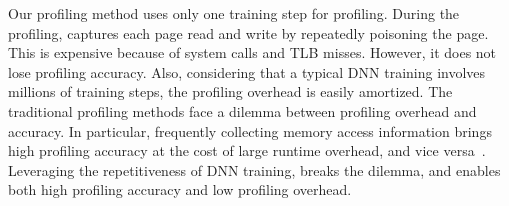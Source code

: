 

Our profiling method uses only one training step for profiling. During the profiling, \name captures each page read and write by repeatedly poisoning the page. This is expensive because of system calls and TLB misses. However, it does not lose profiling accuracy. Also, considering that a typical DNN training involves millions of training steps, the profiling overhead is easily amortized.  The traditional profiling methods face a %
dilemma between profiling overhead and accuracy. In particular, frequently collecting memory access information brings high profiling accuracy at the cost of large runtime overhead, and vice versa~\cite{Thermostat:asplos17,RAMinate:socc16,heteros:isca17, sc18:wu, unimem:sc17}. Leveraging the repetitiveness of DNN training, \name breaks the dilemma, and enables both high profiling accuracy and low profiling overhead. 



